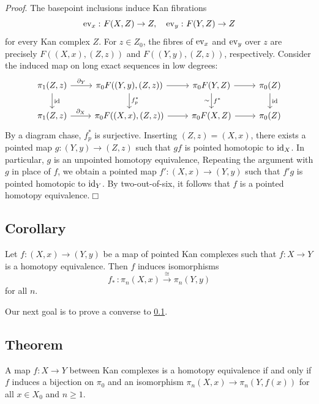         \emph{Proof}. The basepoint inclusions induce Kan fibrations
        \begin{equation*}
            \operatorname{ev}_x \,\colon F(X, Z) \to Z, \quad \operatorname{ev}_y \,\colon F(Y, Z) \to Z
        \end{equation*}
        for every Kan complex $Z$. For $z \in Z_0$, the fibres of $\operatorname{ev}_x$ and $\operatorname{ev}_y$ over $z$ are precisely $F((X, x),(Z, z))$ and $F((Y, y),(Z ,z))$, respectively. Consider the induced map on long exact sequences in low degrees:
        \begin{equation*}
            \begin{tikzcd}
                \pi_1(Z, z) \arrow[d, "\id"] \arrow[r, "\partial_Y"] & \pi_0 F((Y, y),(Z, z)) \arrow[d, "f^{*}_p"] \arrow[r] & \pi_0 F(Y, Z) \arrow[d, "\sim"', "f^{*}"] \arrow[r] & \pi_0(Z) \arrow[d, "\id"] \\
                \pi_1(Z, z) \arrow[r, "\partial_X"] & \pi_0 F((X, x),(Z, z)) \arrow[r] & \pi_0 F(X, Z) \arrow[r] & \pi_0(Z) 
            \end{tikzcd}
        \end{equation*}
        By a diagram chase, $f^{*}_p$ is surjective. Inserting $(Z, z) = (X, x)$, there exists a pointed map $g \colon (Y, y) \to (Z, z)$ such that $gf$ is pointed homotopic to $\operatorname{id}_X$. In particular, $g$ is an unpointed homotopy equivalence, Repeating the argument with $g$ in place of $f$, we obtain a pointed map $f' \colon (X, x) \to (Y, y)$ such that $f'g$ is pointed homotopic to $\operatorname{id}_Y$. By two-out-of-six, it follows that $f$ is a pointed homotopy equivalence.\hfill$\Box$

    \subsection{Corollary}\label{chV-3-10}
        Let $f \colon (X, x) \to (Y, y)$ be a map of pointed Kan complexes such that $f \colon X \to Y$ is a homotopy equivalence. Then $f$ induces isomorphisms
        \begin{equation*}
            f_{*} \,\colon \pi_n(X, x) \xrightarrow{\cong} \pi_n(Y, y)
        \end{equation*}
        for all $n$.
        \medskip

        Our next goal is to prove a converse to \ref{chV-3-10}.

    \subsection{Theorem}\label{chV-3-11}
        A map $f \colon X \to Y$ between Kan complexes is a homotopy equivalence if and only if $f$ induces a bijection on $\pi_0$ and an isomorphism $\pi_n(X, x) \to \pi_n(Y, f(x))$ for all $x \in X_0$ and $n \geq 1$.
        \medskip

